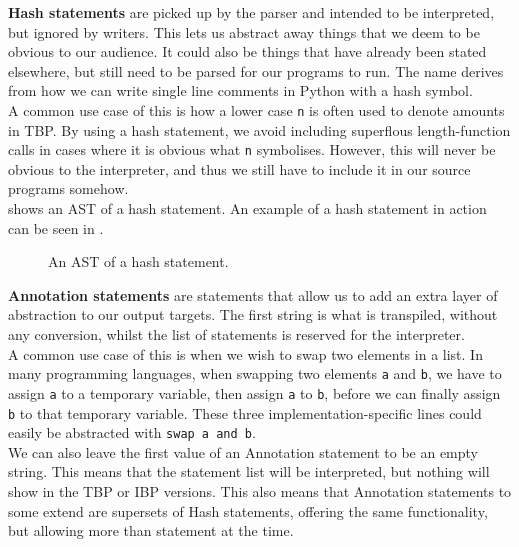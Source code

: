 \textbf{Hash statements} are picked up by the parser and intended to be interpreted, but ignored by writers. This lets us abstract away things that we deem to be obvious to our audience. It could also be things that have already been stated elsewhere, but still need to be parsed for our programs to run. The name derives from how we can write single line comments in Python with a hash symbol. \\

A common use case of this is how a lower case \texttt{n} is often used to denote amounts in TBP. By using a hash statement, we avoid including superflous length-function calls in cases where it is obvious what \texttt{n} symbolises. However, this will never be obvious to the interpreter, and thus we still have to include it in our source programs somehow. \\

 shows an AST of a hash statement. An example of a hash statement in action can be seen in . \\

\begin{figure}[ht!]
    \caption{An AST of a hash statement.}
    \label{An AST of a hash statement.}
\end{figure}

\textbf{Annotation statements} are statements that allow us to add an extra layer of abstraction to our output targets. The first string is what is transpiled, without any conversion, whilst the list of statements is reserved for the interpreter. \\

A common use case of this is when we wish to swap two elements in a list. In many programming languages, when swapping two elements \texttt{a} and \texttt{b}, we have to assign \texttt{a} to a temporary variable, then assign \texttt{a} to \texttt{b}, before we can finally assign \texttt{b} to that temporary variable. These three implementation-specific lines could easily be abstracted with \texttt{swap a and b}. \\

We can also leave the first value of an Annotation statement to be an empty string. This means that the statement list will be interpreted, but nothing will show in the TBP or IBP versions. This also means that Annotation statements to some extend are supersets of Hash statements, offering the same functionality, but allowing more than statement at the time. \\

